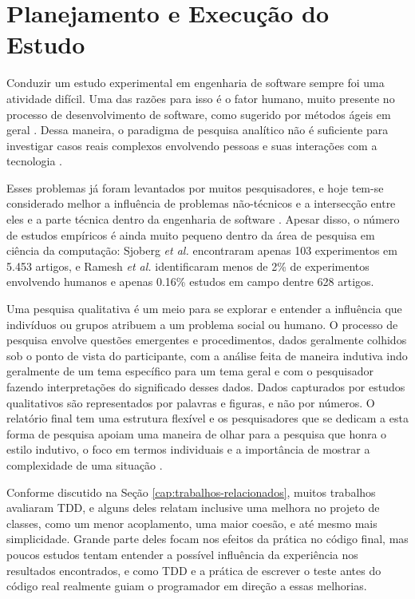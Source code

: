 \chapter{Planejamento e Execução do Estudo} 
\label{cap:qualitativo-planejamento}

Conduzir um estudo experimental em engenharia de software sempre foi uma
atividade difícil. Uma das razões para isso é o fator humano, muito presente 
no processo de desenvolvimento de software, como sugerido por métodos ágeis  em
geral \cite{AgileManifesto}. Dessa maneira, o paradigma de pesquisa analítico 
não é suficiente para investigar casos reais complexos envolvendo pessoas e 
suas interações com a tecnologia \cite{guidelines-case-study}.

Esses problemas já foram levantados por muitos pesquisadores, e hoje tem-se 
considerado melhor a influência de problemas não-técnicos e a intersecção entre 
eles e a parte técnica dentro da engenharia de software \cite{seaman}.
Apesar disso, o número de estudos empíricos é ainda muito pequeno dentro da área
de pesquisa em ciência da computação: Sjoberg \textit{et al.} \cite{sjoberg} encontraram
apenas 103 experimentos em 5.453 artigos, e Ramesh \textit{et al.} \cite{ramesh}
identificaram menos de 2\% de experimentos envolvendo humanos e apenas 0.16\% 
estudos em campo dentre 628 artigos.

Uma pesquisa qualitativa é um meio para se explorar e entender a influência que 
indivíduos ou grupos atribuem a um problema social ou humano. O processo de
pesquisa envolve questões emergentes e procedimentos, dados geralmente colhidos
sob o ponto de vista do participante, com a análise feita de maneira indutiva
indo geralmente de um tema específico para um tema geral e com o pesquisador
fazendo interpretações do significado desses dados. Dados capturados por estudos
qualitativos são representados por palavras e figuras, e não por números.
O relatório final tem uma estrutura flexível e os pesquisadores que se
dedicam a esta forma de pesquisa apoiam uma maneira de olhar para a pesquisa que
honra o estilo indutivo, o foco em termos individuais e a importância de mostrar a 
complexidade de uma situação \cite{creswell}. 

Conforme discutido na Seção \ref{cap:trabalhos-relacionados}, muitos 
trabalhos avaliaram TDD, e alguns deles relatam inclusive uma melhora
no projeto de classes, como um menor acoplamento, uma maior coesão, e até mesmo
mais simplicidade. 
Grande parte deles focam nos efeitos da prática no código final, mas poucos 
estudos tentam entender a possível influência da experiência
nos resultados encontrados, e como TDD e a prática de escrever o teste 
antes do código real realmente guiam o programador 
em direção a essas melhorias.

